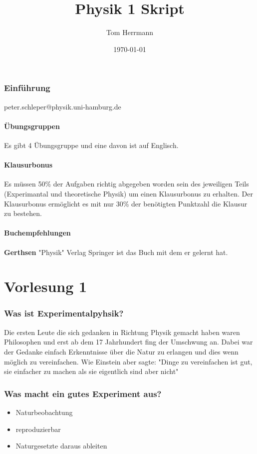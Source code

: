 \documentclass[11pt]{article}
\title{Physik 1 Skript}
\date{\today}
\begin{document}
	\lstset{language=Java}
	\author{Tom Herrmann}
	
	\maketitle
	
	\tableofcontents
	
	\newpage
	
	\section{Einführung}
	peter.schleper@physik.uni-hamburg.de
	\subsection{Übungsgruppen}
	Es gibt 4 Übungsgruppe und eine davon ist auf Englisch.
	\subsection{Klausurbonus}
	Es müssen 50\%  der Aufgaben richtig abgegeben worden sein des jeweiligen Teils (Experimantal und theoretische Physik) um einen Klausurbonus zu erhalten.
	Der Klausurbonus ermöglicht es mit nur 30\% der benötigten Punktzahl die Klausur zu bestehen.
	\subsection{Buchempfehlungen}
	\textbf{Gerthsen} "Physik" Verlag Springer ist das Buch mit dem er gelernt hat.
	\part{Vorlesung 1}
	\section{Was ist Experimentalpyhsik?}
	Die ersten Leute die sich gedanken in Richtung Physik gemacht haben waren Philosophen und erst ab dem 17 Jahrhundert fing der Umschwung an. 
	Dabei war der Gedanke einfach Erkenntnisse über die Natur zu erlangen und dies wenn möglich zu vereinfachen. Wie Einstein aber sagte: "Dinge zu vereinfachen ist gut, sie einfacher zu machen als sie eigentlich sind aber nicht"
	\section{Was macht ein gutes Experiment aus?}
	\begin{itemize}
		\item Naturbeobachtung
		\item reproduzierbar
		\item Naturgesetzte daraus ableiten
	\end{itemize}
\end{document}
